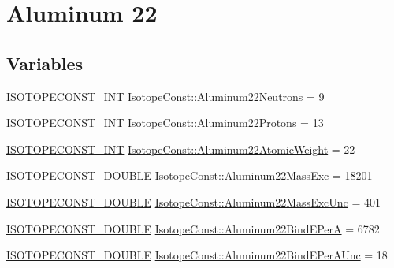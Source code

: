 \hypertarget{group___isotope_const-_aluminum-_al22}{}\section{Aluminum 22}
\label{group___isotope_const-_aluminum-_al22}
\subsection*{Variables}
\begin{DoxyCompactItemize}
\item 
\mbox{\hyperlink{group___isotope_const-_macros_ga5f18360b3e99483a35c32d789e62621c}{I\+S\+O\+T\+O\+P\+E\+C\+O\+N\+S\+T\+\_\+\+I\+NT}} \mbox{\hyperlink{group___isotope_const-_aluminum-_al22_ga5ed4843eaf0eff6fdc95169f214cbafd}{Isotope\+Const\+::\+Aluminum22\+Neutrons}} = 9
\item 
\mbox{\hyperlink{group___isotope_const-_macros_ga5f18360b3e99483a35c32d789e62621c}{I\+S\+O\+T\+O\+P\+E\+C\+O\+N\+S\+T\+\_\+\+I\+NT}} \mbox{\hyperlink{group___isotope_const-_aluminum-_al22_ga90b8fc84e89a56fbdba52185d2766798}{Isotope\+Const\+::\+Aluminum22\+Protons}} = 13
\item 
\mbox{\hyperlink{group___isotope_const-_macros_ga5f18360b3e99483a35c32d789e62621c}{I\+S\+O\+T\+O\+P\+E\+C\+O\+N\+S\+T\+\_\+\+I\+NT}} \mbox{\hyperlink{group___isotope_const-_aluminum-_al22_ga45990ecc27176f6de6e78e3a11f39eed}{Isotope\+Const\+::\+Aluminum22\+Atomic\+Weight}} = 22
\item 
\mbox{\hyperlink{group___isotope_const-_macros_ga8f45a7272ce02c0b4c65c44636ed719a}{I\+S\+O\+T\+O\+P\+E\+C\+O\+N\+S\+T\+\_\+\+D\+O\+U\+B\+LE}} \mbox{\hyperlink{group___isotope_const-_aluminum-_al22_gac7ff9cd15272c76971142484cd2c50c3}{Isotope\+Const\+::\+Aluminum22\+Mass\+Exc}} = 18201
\item 
\mbox{\hyperlink{group___isotope_const-_macros_ga8f45a7272ce02c0b4c65c44636ed719a}{I\+S\+O\+T\+O\+P\+E\+C\+O\+N\+S\+T\+\_\+\+D\+O\+U\+B\+LE}} \mbox{\hyperlink{group___isotope_const-_aluminum-_al22_ga56b96e058b9d9135a37dee562cecb729}{Isotope\+Const\+::\+Aluminum22\+Mass\+Exc\+Unc}} = 401
\item 
\mbox{\hyperlink{group___isotope_const-_macros_ga8f45a7272ce02c0b4c65c44636ed719a}{I\+S\+O\+T\+O\+P\+E\+C\+O\+N\+S\+T\+\_\+\+D\+O\+U\+B\+LE}} \mbox{\hyperlink{group___isotope_const-_aluminum-_al22_gad07c7421f7cc9d7790744e65626b5ba5}{Isotope\+Const\+::\+Aluminum22\+Bind\+E\+PerA}} = 6782
\item 
\mbox{\hyperlink{group___isotope_const-_macros_ga8f45a7272ce02c0b4c65c44636ed719a}{I\+S\+O\+T\+O\+P\+E\+C\+O\+N\+S\+T\+\_\+\+D\+O\+U\+B\+LE}} \mbox{\hyperlink{group___isotope_const-_aluminum-_al22_ga2ac07ccdd21a9f12e8459ce1a4cbb854}{Isotope\+Const\+::\+Aluminum22\+Bind\+E\+Per\+A\+Unc}} = 18

\end{DoxyCompactItemize}

